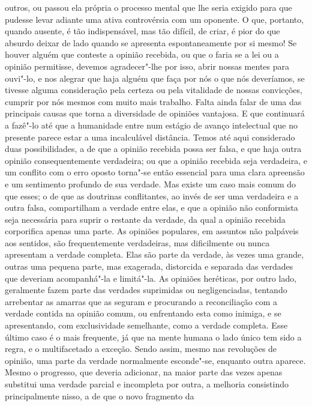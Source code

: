 outros, ou passou ela própria o processo mental que lhe seria exigido
para que pudesse levar adiante uma ativa controvérsia com um oponente.
O que, portanto, quando ausente, é tão indispensável, mas tão difícil,
de criar, é pior do que absurdo deixar de lado quando se apresenta
espontaneamente por si mesmo! Se houver alguém que conteste a opinião
recebida, ou que o faria se a lei ou a opinião permitisse, devemos
agradecer"-lhe por isso, abrir nossas mentes para ouvi"-lo, e nos
alegrar que haja alguém que faça por nós o que nós deveríamos, se
tivesse alguma consideração pela certeza ou pela vitalidade de nossas
convicções, cumprir por nós mesmos com muito mais trabalho.
\linebreak
Falta ainda falar de uma das principais causas que torna a diversidade
de opiniões vantajosa. E que continuará a fazê"-lo até que a
humanidade entre num estágio de avanço intelectual que no presente
parece estar a uma incalculável distância. Temos até aqui considerado
duas possibilidades, a de que a opinião recebida possa ser falsa, e que
haja outra opinião consequentemente verdadeira; ou que a opinião
recebida seja verdadeira, e um conflito com o erro oposto torna"-se então
essencial para uma clara apreensão e um sentimento profundo de sua
verdade. Mas existe um caso mais comum do que esses; o de que as
doutrinas conflitantes, ao invés de ser uma verdadeira e a outra falsa,
compartilham a verdade entre elas, e que a opinião não conformista seja
necessária para suprir o restante da verdade, da qual a opinião
recebida corporifica apenas uma parte. As opiniões populares, em
assuntos não palpáveis aos sentidos, são frequentemente verdadeiras,
mas dificilmente ou nunca apresentam a verdade completa. Elas são parte da
verdade, às vezes uma grande, outras uma pequena parte, mas exagerada,
distorcida e separada das verdades que deveriam acompanhá"-la e
limitá"-la. As opiniões heréticas, por outro lado, geralmente fazem
parte das verdades suprimidas ou negligenciadas, tentando arrebentar as
amarras que as seguram e procurando a reconciliação com a verdade
contida na opinião comum, ou enfrentando esta como inimiga, e se apresentando,
com exclusividade semelhante, como a verdade completa. Esse último
caso é o mais frequente, já que na mente humana o lado único tem sido a
regra, e o multifacetado a exceção. Sendo assim, mesmo nas revoluções
de opinião, uma parte da verdade normalmente esconde"-se, enquanto outra
aparece. Mesmo o progresso, que deveria adicionar, na maior parte das
vezes apenas substitui uma verdade parcial e incompleta por outra, a
melhoria consistindo principalmente nisso, a de que o novo fragmento da
